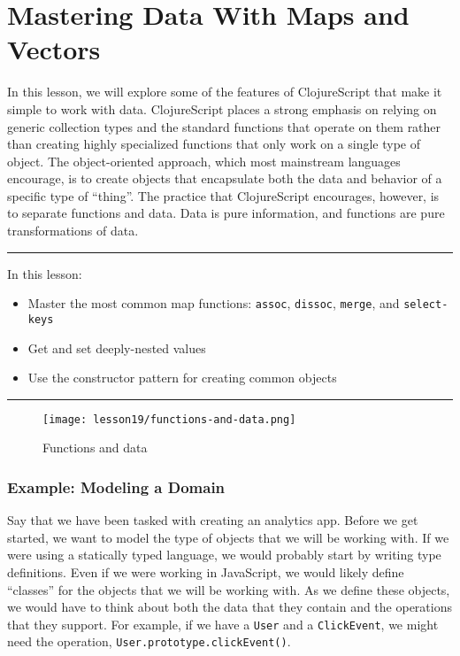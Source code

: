 \documentclass[10pt,twoside,openright]{memoir}
\begin{document}
\chapter{Mastering Data With Maps and Vectors}

In this lesson, we will explore some of the features of ClojureScript
that make it simple to work with data. ClojureScript places a strong
emphasis on relying on generic collection types and the standard
functions that operate on them rather than creating highly specialized
functions that only work on a single type of object. The object-oriented
approach, which most mainstream languages encourage, is to create
objects that encapsulate both the data and behavior of a specific type
of ``thing''. The practice that ClojureScript encourages, however, is to
separate functions and data. Data is pure information, and functions are
pure transformations of data.

\begin{center}\rule{0.5\linewidth}{0.5pt}\end{center}

In this lesson:

\begin{itemize}
\tightlist
\item
  Master the most common map functions: \texttt{assoc}, \texttt{dissoc},
  \texttt{merge}, and \texttt{select-keys}
\item
  Get and set deeply-nested values
\item
  Use the constructor pattern for creating common objects
\end{itemize}

\begin{center}\rule{0.5\linewidth}{0.5pt}\end{center}

\begin{figure}[H]
\caption{Functions and data}
\centering
\texttt{[image: lesson19/functions-and-data.png]}
\end{figure}


\subsection{Example: Modeling a Domain}

Say that we have been tasked with creating an analytics app. Before we
get started, we want to model the type of objects that we will be
working with. If we were using a statically typed language, we would
probably start by writing type definitions. Even if we were working in
JavaScript, we would likely define ``classes'' for the objects that we
will be working with. As we define these objects, we would have to think
about both the data that they contain and the operations that they
support. For example, if we have a \texttt{User} and a
\texttt{ClickEvent}, we might need the operation,
\texttt{User.prototype.clickEvent()}.
\end{document}
